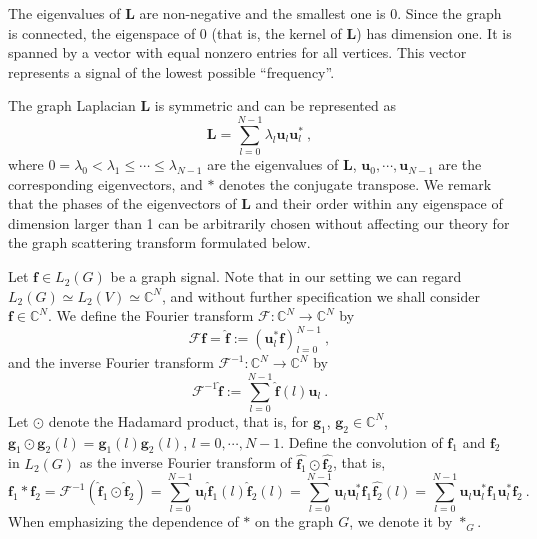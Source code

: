 \documentclass{article}
\def\l{\lambda}
\def\CC{\mathbb{C}}
\def\cF{\boldsymbol{\mathcal{F}}}
\def\BL{\boldsymbol{L}}
\def\Bf{\boldsymbol{f}}
\def\Bg{\boldsymbol{g}}
\def\Bu{\boldsymbol{u}}
\begin{document}
The eigenvalues of $\BL$ are non-negative and the smallest one is $0$. Since the graph is connected, the eigenspace of $0$ (that is, the kernel of $\BL$) has dimension one. It is spanned by a vector with equal nonzero entries for all vertices. This vector represents a signal of the lowest possible ``frequency''. 

The graph Laplacian $\BL$ is symmetric and can be represented as
\begin{equation}\label{eq:eigendecomposition}
\BL = \sum_{l=0}^{N-1} \l_l \Bu_l \Bu_l^* ~,
\end{equation}
where $0 = \l_0 < \l_1 \leq \cdots \leq \l_{N-1}$ are the eigenvalues of $\BL$, $\Bu_0, \cdots, \Bu_{N-1}$ are the corresponding eigenvectors, and $*$ denotes the conjugate transpose. We remark that the phases of the eigenvectors of $\BL$ and their order within any eigenspace of dimension larger than 1 can be arbitrarily chosen without affecting our theory for the graph scattering transform formulated below.

Let $\Bf \in L_2(G)$ be a graph signal. Note that in our setting we can regard $L_2(G) \simeq L_2(V) \simeq \CC^N$, and without further specification we shall consider $\Bf \in \CC^N$. We define the Fourier transform $\cF: \CC^N \rightarrow \CC^N$ by
\begin{equation}\label{eq:fourierTransform}
\cF \Bf = \hat{\Bf} := \left( \Bu_l^* \Bf \right)_{l=0}^{N-1} ~,
\end{equation}
and the inverse Fourier transform $\cF^{-1}: \CC^N \rightarrow \CC^N$ by
\begin{equation}\label{eq:invFourierTransform}
\cF^{-1} \hat{\Bf} := \sum_{l=0}^{N-1} \hat{\Bf}(l) \Bu_l ~.
\end{equation}
Let  $\odot$ denote the Hadamard product, that is, for $\Bg_1$, $\Bg_2 \in \CC^N$, $\Bg_1 \odot \Bg_2 (l) = \Bg_1(l) \Bg_2(l)$, $l = 0, \cdots, N-1$. Define the convolution of $\Bf_1$ and $\Bf_2$ in $L_2(G)$ as the inverse Fourier transform of $\hat{\Bf_1} \odot \hat{\Bf_2}$, that is,
\begin{equation}\label{eq:defconvfg}
\Bf_1 \ast \Bf_2 = \cF^{-1} \left( \hat{\Bf}_1 \odot \hat{\Bf}_2 \right) = \sum_{l=0}^{N-1} \Bu_l  \hat{\Bf}_1 (l) \hat{\Bf}_2 (l) =\sum_{l=0}^{N-1} \Bu_l \Bu_l^* \Bf_1 \hat{\Bf_2}(l) =\sum_{l=0}^{N-1} \Bu_l \Bu_l^* \Bf_1 \Bu_l^* \Bf_2  ~.
\end{equation}
When emphasizing the dependence of $\ast$ on the graph $G$, we denote it by $\ast_G$. 
\end{document}
